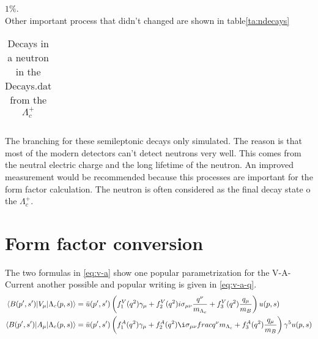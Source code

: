 \(1 \%\).\\
Other important process that didn't changed are shown in table{\eqref{ta:ndecays}}
\begin{longtable}{| c | c | c | c |}
  \caption{Decays in a neutron in the Decays.dat from the \(\Lambda_c^+\)}\label{ta:ndecays}\\ 
  \hline
  
\end{longtable}
The branching for these semileptonic decays only simulated. The reason is that 
most of the modern detectors can't detect neutrons very well. This comes from 
the neutral electric charge and the long lifetime of the neutron. An improved 
measurement would be recommended because this processes are important for 
the form factor calculation. The neutron is often considered as the final 
decay state o the \(\Lambda_c^+\).

\section{Form factor conversion}
The two formulas in {\eqref{eq:v-a}} show one popular parametrization for 
the V-A-Current another possible and popular writing is given in 
{\eqref{eq:v-a-q}}.
\begin{align}
  \langle B(p', s') | V_\mu | \Lambda_c(p, s) \rangle & = \bar{u}(p', s') 
  \left( f^V_1(q^2) \gamma_\mu + f^V_2(q^2)i\sigma_{\mu\nu}\frac{q^\nu}{m_{\Lambda_c}} + 
  f^V_3(q^2)\frac{q_\mu}{m_B} \right) u(p, s) \nonumber \\
  \langle B(p', s') | A_\mu | \Lambda_c(p, s) \rangle & = \bar{u}(p', s') 
  \left( f^A_1(q^2) \gamma_\mu + f^A_2(q^2)\i\sigma_{\mu\nu}frac{q^\nu}{m_{\Lambda_c}} + 
  f^A_3(q^2)\frac{q_\mu}{m_B} \right) \gamma^5 u(p, s) \label{eq:v-a-q}
\end{align}

